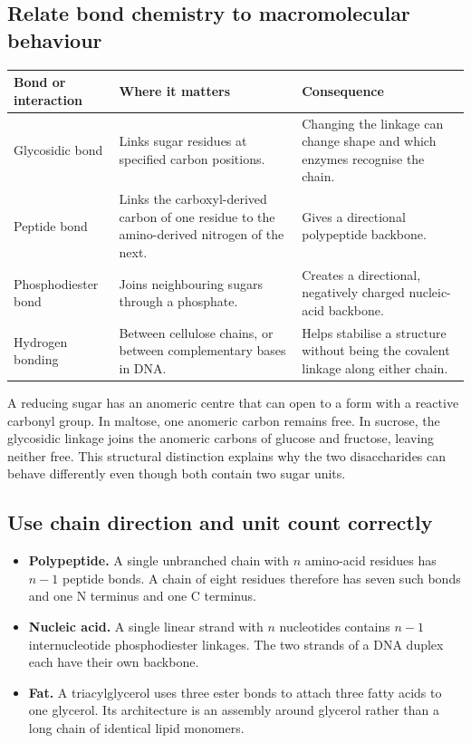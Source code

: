 \documentclass[12pt,a4paper]{article}
\begin{document}
\subsection{Relate bond chemistry to macromolecular behaviour}
\par\vspace{6pt}
\noindent\begin{tabularx}{\linewidth}{|B{3.2cm}|Y|Y|}
\hline
\textbf{Bond or interaction} & \textbf{Where it matters} & \textbf{Consequence} \\ \hline
Glycosidic bond & Links sugar residues at specified carbon positions. & Changing the linkage can change shape and which enzymes recognise the chain. \\ \hline
Peptide bond & Links the carboxyl-derived carbon of one residue to the amino-derived nitrogen of the next. & Gives a directional polypeptide backbone. \\ \hline
Phosphodiester bond & Joins neighbouring sugars through a phosphate. & Creates a directional, negatively charged nucleic-acid backbone. \\ \hline
Hydrogen bonding & Between cellulose chains, or between complementary bases in DNA. & Helps stabilise a structure without being the covalent linkage along either chain. \\ \hline
\end{tabularx}\par

\begin{tcolorbox}[examplebox, title={Explain reducing and nonreducing sugars}]
A reducing sugar has an anomeric centre that can open to a form with a reactive carbonyl group. In maltose, one anomeric carbon remains free. In sucrose, the glycosidic linkage joins the anomeric carbons of glucose and fructose, leaving neither free. This structural distinction explains why the two disaccharides can behave differently even though both contain two sugar units.
\end{tcolorbox}

\subsection{Use chain direction and unit count correctly}
\begin{itemize}[leftmargin=*, itemsep=2pt]
  \item \textbf{Polypeptide.} A single unbranched chain with $n$ amino-acid residues has $n-1$ peptide bonds. A chain of eight residues therefore has seven such bonds and one N terminus and one C terminus.
  \item \textbf{Nucleic acid.} A single linear strand with $n$ nucleotides contains $n-1$ internucleotide phosphodiester linkages. The two strands of a DNA duplex each have their own backbone.
  \item \textbf{Fat.} A triacylglycerol uses three ester bonds to attach three fatty acids to one glycerol. Its architecture is an assembly around glycerol rather than a long chain of identical lipid monomers.
\end{itemize}
\end{document}
